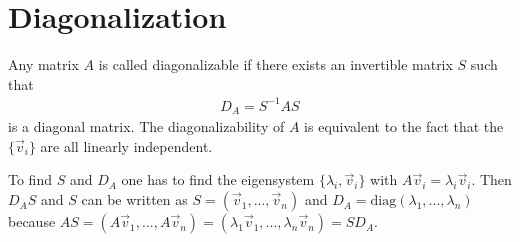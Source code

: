 \documentclass[10pt,a4paper]{book}
\theoremstyle{definition}
\begin{document}
\section{Diagonalization}
Any  matrix $A$ is called diagonalizable if there exists an invertible matrix $S$ such that
\begin{align}
    D_A=S^{-1}AS
\end{align}
is a diagonal matrix. The diagonalizability of $A$ is equivalent to the fact that the $\{\vec{v}_i\}$ are all linearly independent.

To find $S$ and $D_A$ one has to find the eigensystem $\{\lambda_i,\vec{v}_i\}$ with $A\vec{v}_i=\lambda_i\vec{v}_i$. Then $D_AS$ and $S$ can be written as $S=(\vec{v}_1,...,\vec{v}_n)$ and $D_A=\text{diag}(\lambda_1,...,\lambda_n)$ because $AS=(A\vec{v}_1,...,A\vec{v}_n)=(\lambda_1\vec{v}_1,...,\lambda_n\vec{v}_n)=SD_A$.
\end{document}
